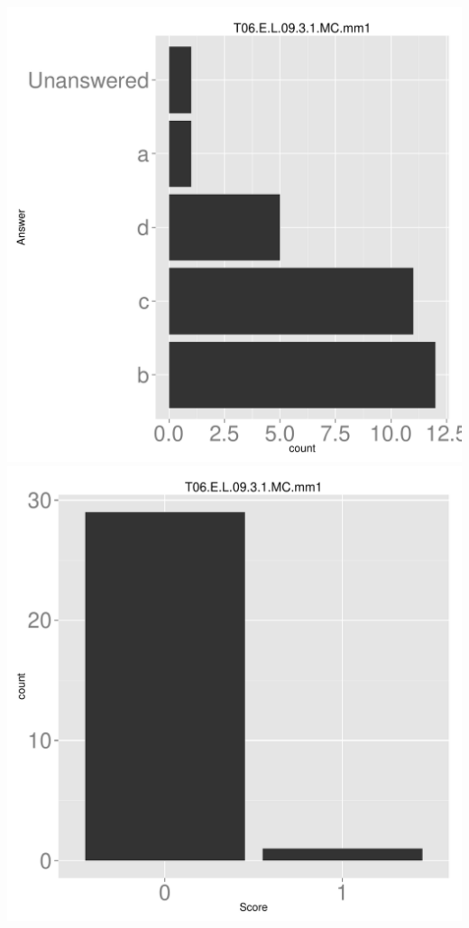 \documentclass[12pt,nohyper]{tufte-handout}\usepackage[]{graphicx}\usepackage[]{color}
\begin{document}
\begin{center} \includegraphics[width=.45\linewidth]{Topic06_39_answer} \includegraphics[width=.45\linewidth]{Topic06_39_score} \end{center} 
\end{document}

